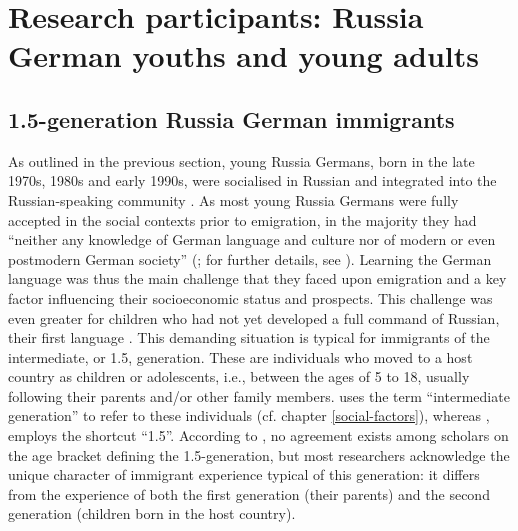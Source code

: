 \section{Research participants: Russia German youths and young adults}{\label{junge-ru-de}}
\subsection{1.5-generation Russia German immigrants}
As outlined in the previous section, young Russia Germans, born in the late 1970s, 1980s and early 1990s, were socialised in Russian \citep[cf.][106]{meng01} and integrated into the Russian-speaking community \citep[cf.][275]{roll03}. As most young Russia Germans were fully accepted in the social contexts prior to emigration, in the majority they had ``neither any knowledge of German language and culture nor of modern or even postmodern German society'' (\citealt[272]{roll03}; for further details, see \citealt{dietz-roll198}). Learning the German language was thus the main challenge that they faced upon emigration and a key factor influencing their socioeconomic status and prospects. This challenge was even greater for children who had not yet developed a full command of Russian, their first language \citep[cf.][106--152]{meng01}. This demanding situation is typical for immigrants of the intermediate, or 1.5, generation.  These are individuals who moved to a host country as children or adolescents, i.e., between the ages of 5 to 18, usually following their parents and/or other family members. \citet{backus1999,backus06} uses the term “intermediate generation” to refer to these individuals (cf. chapter \ref{social-factors}), whereas \citealt{remennickTA}, employs the shortcut “1.5”.  According to \citet{remennickTA}, no agreement exists among scholars on the age bracket defining the 1.5-generation, but most researchers acknowledge the unique character of immigrant experience typical of this generation: it differs from the experience of both the first generation (their parents) and the second generation (children born in the host country). 

